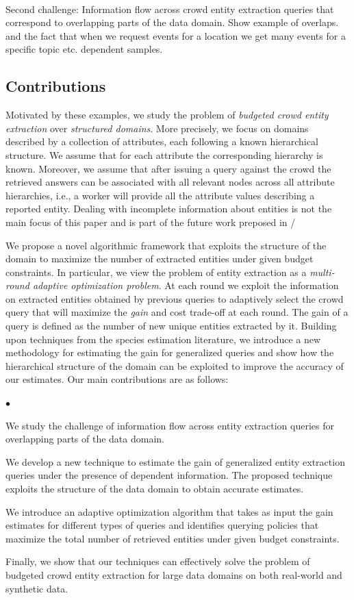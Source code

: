 \documentclass{vldb}
\newcommand{\squishlist}{
   \begin{list}{$\bullet$}
    {
      \setlength{\itemsep}{0pt}
      \setlength{\parsep}{3pt}
      \setlength{\topsep}{3pt}
      \setlength{\partopsep}{0pt}
      \setlength{\leftmargin}{1.5em}
      \setlength{\labelwidth}{1em}
      \setlength{\labelsep}{0.5em} } }
\newcommand{\squishend}{
    \end{list}  }
\begin{document}
\ \\Second challenge: Information flow across crowd entity extraction queries that correspond to overlapping parts of the data domain. Show example of overlaps. and the fact that when we request events for a location we get many events for a specific topic etc. dependent samples.

\subsection{Contributions}
\label{sec:contributions}
Motivated by these examples, we study the problem of {\em budgeted crowd entity extraction} over {\em structured domains}. More precisely, we focus on domains described by a collection of attributes, each following a known hierarchical structure. We assume that for each attribute the corresponding hierarchy is known. Moreover, we assume that after issuing a query against the crowd the retrieved answers can be associated with all relevant nodes across all attribute hierarchies, i.e., a worker will provide all the attribute values describing a reported entity. Dealing with incomplete information about entities is not the main focus of this paper and is part of the future work preposed in /

We propose a novel algorithmic framework that exploits the structure of the domain to maximize the number of extracted entities under given budget constraints. In particular, we view the problem of entity extraction as a {\em multi-round adaptive optimization problem}. At  each round we exploit the information on extracted entities obtained by previous queries to adaptively select the crowd query that will maximize the {\em gain} and cost trade-off at each round. The gain of a query is defined as the number of new unique entities extracted by it. Building upon techniques from the species estimation literature, we introduce a new methodology for estimating the gain for generalized queries and show how the hierarchical structure of the domain can be exploited to improve the accuracy of our estimates. Our main contributions are as follows:

\squishlist
\item We study the challenge of information flow across entity extraction queries for overlapping parts of the data domain.
\item We develop a new technique to estimate the gain of generalized entity extraction queries under the presence of dependent information. The proposed technique exploits the structure of the data domain to obtain accurate estimates. 
\item We introduce an adaptive optimization algorithm that takes as input the gain estimates for different types of queries and identifies querying policies that maximize the total number of retrieved entities under given budget constraints. 
\item Finally, we show that our techniques can effectively solve the problem of budgeted crowd entity extraction for large data domains on both real-world and synthetic data.
\squishend
\end{document}
